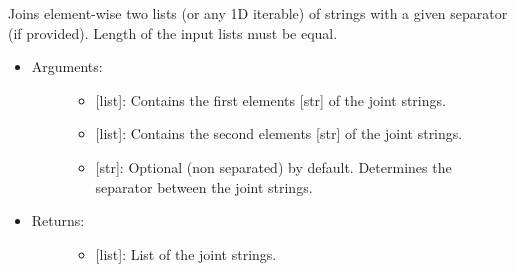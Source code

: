 \documentclass[letterpaper,10pt,english]{sphinxmanual}
\begin{document}
\begin{fulllineitems}
\begin{itemize}
\begin{description}
\end{description}

\end{itemize}

\end{fulllineitems}


\begin{fulllineitems}
\label{\detokenize{strings:data_tools.strings.join_str_lists}}
Joins element-wise two lists (or any 1D iterable) of strings with a
given separator (if provided). Length of the input lists must be
equal.
\begin{itemize}
\item {} \begin{description}
\item[{Arguments:}] \leavevmode\begin{itemize}
\item {} 
 {[}list{]}: Contains the first elements {[}str{]} of the joint
strings.

\item {} 
 {[}list{]}: Contains the second elements {[}str{]} of the joint
strings.

\item {} 
 {[}str{]}: Optional  (non separated) by default.
Determines the separator between the joint strings.

\end{itemize}

\end{description}

\item {} \begin{description}
\item[{Returns:}] \leavevmode\begin{itemize}
\item {} 
{[}list{]}: List of the joint strings.

\end{itemize}

\end{description}


\end{itemize}
\end{fulllineitems}
\end{document}
